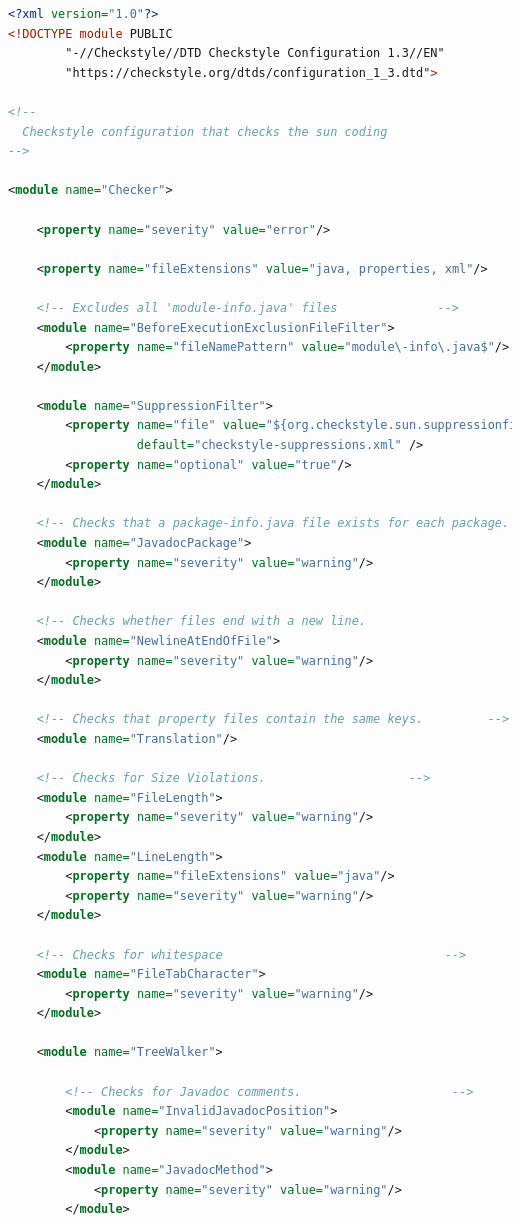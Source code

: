 \begin{lstlisting}[language=XML, caption={Personalizzazioni regole di Sun Checkstyle}]
<?xml version="1.0"?>
<!DOCTYPE module PUBLIC
        "-//Checkstyle//DTD Checkstyle Configuration 1.3//EN"
        "https://checkstyle.org/dtds/configuration_1_3.dtd">

<!--
  Checkstyle configuration that checks the sun coding
-->

<module name="Checker">

    <property name="severity" value="error"/>

    <property name="fileExtensions" value="java, properties, xml"/>

    <!-- Excludes all 'module-info.java' files              -->
    <module name="BeforeExecutionExclusionFileFilter">
        <property name="fileNamePattern" value="module\-info\.java$"/>
    </module>

    <module name="SuppressionFilter">
        <property name="file" value="${org.checkstyle.sun.suppressionfilter.config}"
                  default="checkstyle-suppressions.xml" />
        <property name="optional" value="true"/>
    </module>

    <!-- Checks that a package-info.java file exists for each package.     -->
    <module name="JavadocPackage">
        <property name="severity" value="warning"/>
    </module>

    <!-- Checks whether files end with a new line.                        -->
    <module name="NewlineAtEndOfFile">
        <property name="severity" value="warning"/>
    </module>

    <!-- Checks that property files contain the same keys.         -->
    <module name="Translation"/>

    <!-- Checks for Size Violations.                    -->
    <module name="FileLength">
        <property name="severity" value="warning"/>
    </module>
    <module name="LineLength">
        <property name="fileExtensions" value="java"/>
        <property name="severity" value="warning"/>
    </module>

    <!-- Checks for whitespace                               -->
    <module name="FileTabCharacter">
        <property name="severity" value="warning"/>
    </module>

    <module name="TreeWalker">

        <!-- Checks for Javadoc comments.                     -->
        <module name="InvalidJavadocPosition">
            <property name="severity" value="warning"/>
        </module>
        <module name="JavadocMethod">
            <property name="severity" value="warning"/>
        </module>
        

\end{lstlisting}
